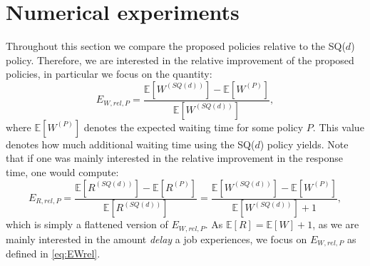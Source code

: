\documentclass[12pt]{report}
\newcommand{\E}{\mathbb{E}}
\begin{document}
\section{Numerical experiments} \label{sec:numExperiments}
Throughout this section we compare the proposed policies relative to the SQ($d$) policy. Therefore, we are interested in the relative improvement of the proposed policies, in particular we focus on the quantity:
\begin{equation}\label{eq:EWrel}
E_{W, rel, P} = \frac{\E[W^{(SQ(d))}] - \E[W^{(P)}]}{\E[W^{(SQ(d))}]},
\end{equation}
where $\E[W^{(P)}]$ denotes the expected waiting time for some policy $P$. This value denotes how much additional waiting time using the SQ($d$) policy yields. Note that if one was mainly interested in the relative improvement in the response time, one would compute:
$$
E_{R, rel, P} = \frac{\E[R^{(SQ(d))}] - \E[R^{(P)}]}{\E[R^{(SQ(d))}]} = \frac{\E[W^{(SQ(d))}] - \E[W^{(P)}]}{\E[W^{(SQ(d))}] + 1},
$$
which is simply a flattened version of $E_{W, rel, P}$. As $\E[R]=\E[W]+1$, as we are mainly interested in the amount \textit{delay} a job experiences, we focus on $E_{W, rel, P}$ as defined in \eqref{eq:EWrel}.
\end{document}

